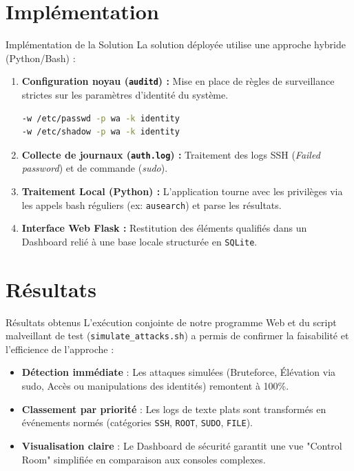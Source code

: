 \documentclass[10pt]{beamer}
\begin{document}
\section{Implémentation}
\begin{frame}[fragile]{Implémentation de la Solution}
    La solution déployée utilise une approche hybride (Python/Bash) :
    \vspace{0.3cm}
    \begin{enumerate}
        \item \textbf{Configuration noyau (\texttt{auditd}) :} 
        Mise en place de règles de surveillance strictes sur les paramètres d'identité du système.
        \begin{lstlisting}[language=bash]
-w /etc/passwd -p wa -k identity
-w /etc/shadow -p wa -k identity\end{lstlisting}
        \item \textbf{Collecte de journaux (\texttt{auth.log}) :}
        Traitement des logs SSH (\textit{Failed password}) et de commande (\textit{sudo}).
        \item \textbf{Traitement Local (Python) :} L'application tourne avec les privilèges via les appels bash réguliers (ex: \texttt{ausearch}) et parse les résultats.
        \item \textbf{Interface Web Flask :} Restitution des éléments qualifiés dans un Dashboard relié à une base locale structurée en \texttt{SQLite}.
    \end{enumerate}
\end{frame}

\section{Résultats}
\begin{frame}{Résultats obtenus}
    L’exécution conjointe de notre programme Web et du script malveillant de test (\texttt{simulate\_attacks.sh}) a permis de confirmer la faisabilité et l'efficience de l'approche :
    \vspace{0.3cm}
    \begin{itemize}
        \item \textbf{Détection immédiate} : Les attaques simulées (Bruteforce, Élévation via sudo, Accès ou manipulations des identités) remontent à 100\%.
        \item \textbf{Classement par priorité} : Les logs de texte plats sont transformés en événements normés (catégories \texttt{SSH}, \texttt{ROOT}, \texttt{SUDO}, \texttt{FILE}).
        \item \textbf{Visualisation claire} : Le Dashboard de sécurité garantit une vue "Control Room" simplifiée en comparaison aux consoles complexes.
    \end{itemize}
\end{frame}
\end{document}
